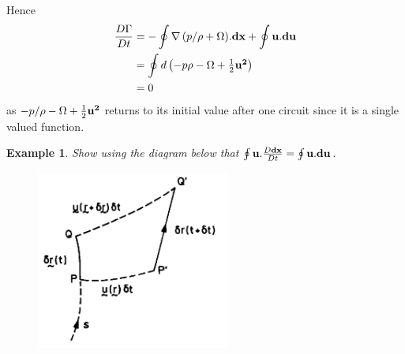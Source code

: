 \documentclass[twoside,a4paper,11pt]{report}
\newtheorem{exmp}{Example}}
\begin{document}
Hence
\begin{align*}
 \frac{D\Gamma }{Dt} & =-\oint {\nabla \left( {p/ {\rho +\Omega }} 
\right)} . {{\bf dx}}+\oint {{{\bf u}}. {{\bf du}}} \\ 
&  =\oint {d\left( {{-p}  {\rho -\Omega +\textstyle{1 \over 2}{{\bf 
u}}^{{\bf 2}}}} \right)} \\ 
 & =0 \\ 
 \end{align*}
as ${-p}/{\rho 
-\Omega +\textstyle{1 \over 2}{{\bf u}}^{{\bf 2}}}$ returns to its 
initial value after one circuit since it is a single valued function.


\begin{exmp}
Show using the diagram below that $\oint {{\rm 
{\bf u}}. \frac{D{{\bf dx}}}{Dt}} =\oint {{{\bf u}}. 
{{\bf du}}} $.
\end{exmp}

\begin{figure}
\centerline{\includegraphics[width=2.5in]{Section44.pdf}}
\label{fig4}
\end{figure}






\end{document}
